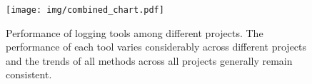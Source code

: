     \begin{figure}[t]
    \centering
    \texttt{[image: img/combined\_chart.pdf]}
    \caption{Performance of logging tools among different projects. The performance of each tool varies considerably across different projects and the trends of all methods across all projects generally remain consistent. }
         \label{fig:project_diveristy}
    \end{figure}